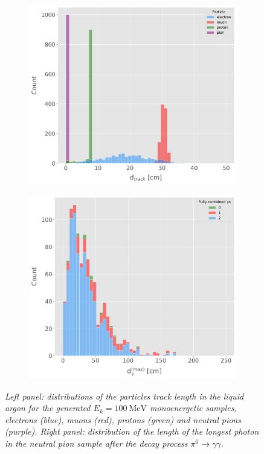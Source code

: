 \begin{figure}[t]
	\begin{subfigure}{0.5\textwidth}
		\centering
		\includegraphics[width=.99\linewidth]{Images/Matched_Filter/particle_length}
	\end{subfigure}
	\begin{subfigure}{0.5\textwidth}
		\centering
		\includegraphics[width=.99\linewidth]{Images/Matched_Filter/gamma_length}
	\end{subfigure}
	\caption{\textit{Left panel: distributions of the particles track length in the liquid argon for the generated $E_{k} = 100 \ \mathrm{MeV}$ monoenergetic samples, electrons (blue), muons (red), protons (green) and neutral pions (purple). Right panel: distribution of the length of the longest photon in the neutral pion sample after the decay process $\pi^{0} \rightarrow \gamma\gamma$.}}
	\label{fig:lengths}
\end{figure}

